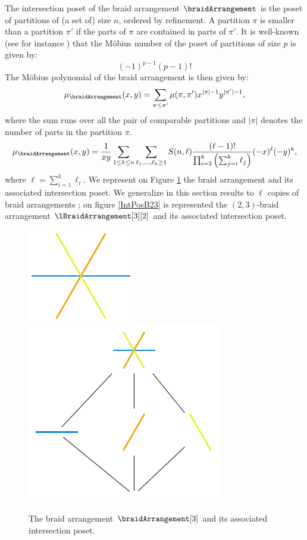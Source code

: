 \begin{remark}
The intersection poset of the braid arrangement $\braidArrangement$ is the poset of partitions of (a set of) size $n$, ordered by refinement.
A partition $\pi$ is smaller than a partition $\pi'$ if the parts of $\pi$ are contained in parts of $\pi'$. 
It is well-known (see for instance \cite{Birkhoff, Rota}) that the Möbius number of the poset of partitions of size $p$ is given by:
\begin{equation*}
(-1)^{p-1} (p-1)!
\end{equation*}
The Möbius polynomial of the braid arrangement is then given by:
\begin{equation}
\mu_{\braidArrangement}(x,y) = \sum_{\pi \leq \pi'} \mu(\pi, \pi') x^{|\pi|-1} y^{|\pi'|-1},
\end{equation}
where the sum runs over all the pair of comparable partitions and $|\pi|$ denotes the number of parts in the partition $\pi$.
\begin{equation}
\mu_{\braidArrangement}(x,y) = \frac{1}{xy}\sum_{1\leq k \leq n} \sum_{\ell_1, \ldots, \ell_k \geq 1} S(n,\ell) \frac{(\ell-1)!}{\prod_{i=2}^{k} \left(\sum_{j=i}^k \ell_j \right)} (-x)^{\ell} (-y)^{k},
\end{equation}
where $\ell=\sum_{i=1}^k \ell_i$.
We represent on Figure \ref{fig:B3} the braid arrangement and its associated intersection poset. We generalize in this section results to $\ell$ copies of braid arrangements ; on figure \ref{IntPosB23} is represented the $(2,3)$-braid arrangement $\lBraidArrangement[3][2]$ and its associated intersection poset. 
\end{remark}

\begin{figure}
\centering
\includegraphics{figures/B3.pdf}
\includegraphics{figures/PosetB3.pdf}
\caption{The braid arrangement $\braidArrangement[3]$ and its associated intersection poset. \label{fig:B3}}
\end{figure}

